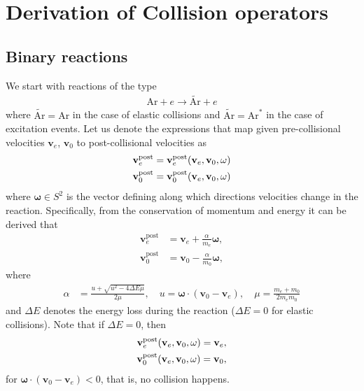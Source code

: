 \documentclass{article}
\newcommand{\vect}[1]{\mathbf{#1}}
\newcommand{\of}[1]{\mleft( #1 \mright)}
\begin{document}


\newpage
\appendix

\section{Derivation of Collision operators}

\subsection{Binary reactions}

We start with reactions of the type
\begin{align*}
\text{Ar} + e \longrightarrow \tilde{\text{Ar}} + e
\end{align*}
where $\tilde{\text{Ar}} = \text{Ar}$ in the case of elastic collisions and $\tilde{\text{Ar}} = \text{Ar}^\ast$ in the case of excitation events. Let us denote the expressions that map given pre-collisional velocities $\vect{v}_e$, $\vect{v}_0$ to post-collisional velocities as 
\begin{align*}
\vect{v}_e^\text{post} &= \vect{v}_e^\text{post} \of{\vect{v}_e, \vect{v}_0, \vect{\omega}}
\\
\vect{v}_0^\text{post} &= \vect{v}_0^\text{post} \of{\vect{v}_e, \vect{v}_0, \vect{\omega}}
\end{align*} 
where $\vect{\omega} \in S^2$ is the vector defining along which directions velocities change in the reaction. Specifically, from the conservation of momentum and energy it can be derived that
\begin{align*}
\vect{v}_e^\text{post} &= \vect{v}_e + \frac{\alpha}{m_e}\vect{\omega},
\\
\vect{v}_0^\text{post} &= \vect{v}_0 - \frac{\alpha}{m_0}\vect{\omega},
\end{align*}
where
\begin{align*}
\alpha &= \frac{u + \sqrt{u^2 - 4 \Delta E \mu}}{2\mu},
\quad 
u = \vect{\omega} \cdot \left( \vect{v}_0 - \vect{v}_e \right),
\quad 
\mu = \frac{m_e+m_0}{2 m_e m_0}
\end{align*}
and $\Delta E$ denotes the energy loss during the reaction ($\Delta E = 0$ for elastic collisions). Note that if $\Delta E=0$, then
\begin{align*}
\vect{v}_e^\text{post} \of{\vect{v}_e, \vect{v}_0, \vect{\omega}} = \vect{v}_e,
\\
\vect{v}_0^\text{post} \of{\vect{v}_e, \vect{v}_0, \vect{\omega}} = \vect{v}_0,
\end{align*} 
for $\vect{\omega} \cdot \left( \vect{v}_0 - \vect{v}_e \right) < 0$, that is, no collision happens.
\end{document}
